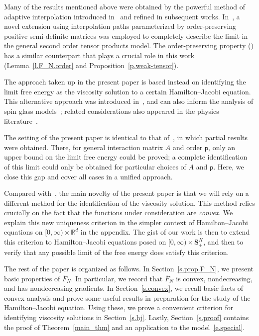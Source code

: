 \documentclass[AHL,Unicode,longabstracts,published]{cedram}
\newcommand{\R}{\mathbb{R}}
\renewcommand{\S}{\mathbf{S}}
\newcommand{\sfp}{\mathsf{p}}
\renewcommand{\bar}{\overline}
\begin{document}
Many of the results mentioned above were obtained by the powerful method of adaptive interpolation introduced in~\cite{barbier2019adaptive2,barbier2019adaptive} and refined in subsequent works. In~\cite{reeves2020information}, a novel extension using interpolation paths parameterized by order-preserving positive semi-definite matrices was employed to completely describe the limit in the general second order tensor products model. The order-preserving property (\cite[Proposition~4]{reeves2020information}) has a similar counterpart that plays a crucial role in this work (Lemma~\ref{l.F_N.order} and Proposition~\ref{p.weak-tensor}).

The approach taken up in the present paper is based instead on identifying the limit free energy as the viscosity solution to a certain Hamilton--Jacobi equation. This alternative approach was introduced in~\cite{mourrat2019hamilton,mourrat2018hamilton}, and can also inform the analysis of spin glass models~\cite{mourrat2019parisi,mourrat2020free, mourrat2020nonconvex,mourrat2020extending}; related considerations also appeared in the physics literature~\cite{barra2010replica, barra2013mean,genovese2009mechanical, guerra2001sum}.


The setting of the present paper is identical to that of~\cite{HBJ}, in which partial results were obtained. There, for general interaction matrix $A$ and order $\sfp$, only an upper bound on the limit free energy could be proved; a complete identification of this limit could only be obtained for particular choices of $A$ and $\sfp$. Here, we close this gap and cover all cases in a unified approach.

Compared with~\cite{HBJ}, the main novelty of the present paper is that we will rely on a different method for the identification of the viscosity solution. This method relies crucially on the fact that the functions under consideration are \emph{convex}. We explain this new uniqueness criterion in the simpler context of Hamilton--Jacobi equations on $[0,\infty) \times \R^d$ in the appendix. The gist of our work is then to extend this criterion to Hamilton--Jacobi equations posed on $[0,\infty) \times \S^K_+$, and then to verify that any possible limit of the free energy does satisfy this criterion.

The rest of the paper is organized as follows. In Section~\ref{s.prop.F_N}, we present basic properties of $\bar F_N$. In particular, we record that $\bar F_N$ is convex, nondecreasing, and has nondecreasing gradients. In Section~\ref{s.convex}, we recall basic facts of convex analysis and prove some useful results in preparation for the study of the Hamilton--Jacobi equation. Using these, we prove a convenient criterion for identifying viscosity solutions in Section~\ref{s.hj}. Lastly, Section~\ref{s.proof} contains the proof of Theorem~\ref{main_thm} and an application to the model~\eqref{e.special}.
\end{document}
